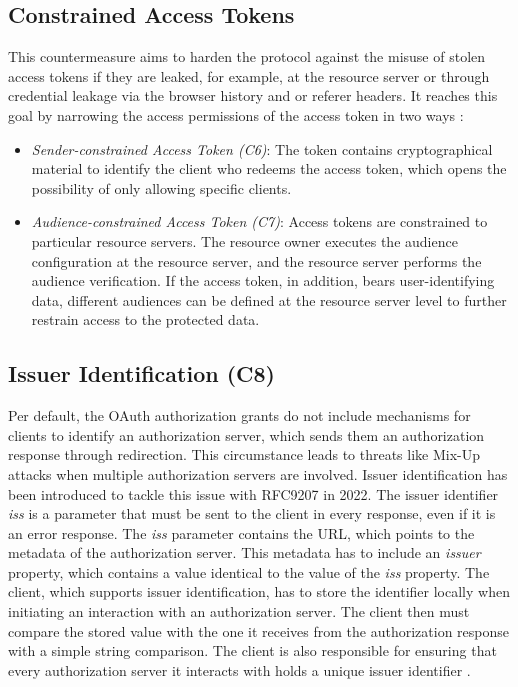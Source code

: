 \subsection{Constrained Access Tokens}
\label{counter:C6_7}
This countermeasure aims to harden the protocol against the misuse of stolen access tokens if they are leaked, for example, at the resource server or through credential leakage via the browser history and or referer headers. It reaches this goal by narrowing the access permissions of the access token in two ways \cite{lodderstedt2020oauth}:
\begin{itemize}
	\item \emph{Sender-constrained Access Token (C6)}: The token contains cryptographical material to identify the client who redeems the access token, which opens the possibility of only allowing specific clients.
	\item \emph{Audience-constrained Access Token (C7)}: Access tokens are constrained to particular resource servers. The resource owner executes the audience configuration at the resource server, and the resource server performs the audience verification. If the access token, in addition, bears user-identifying data, different audiences can be defined at the resource server level to further restrain access to the protected data.
\end{itemize}

 
\subsection[Issuer Identification]{Issuer Identification (C8)}
\label{counter:C8}
Per default, the OAuth authorization grants do not include mechanisms for clients to identify an authorization server, which sends them an authorization response through redirection. This circumstance leads to threats like Mix-Up attacks when multiple authorization servers are involved. Issuer identification has been introduced to tackle this issue with RFC9207 in 2022. The issuer identifier \emph {iss} is a parameter that must be sent to the client in every response, even if it is an error response. The \emph{iss} parameter contains the URL, which points to the metadata of the authorization server. This metadata has to include an \emph{issuer} property, which contains a value identical to the value of the \emph{iss} property. The client, which supports issuer identification, has to store the identifier locally when initiating an interaction with an authorization server. The client then must compare the stored value with the one it receives from the authorization response with a simple string comparison. The client is also responsible for ensuring that every authorization server it interacts with holds a unique issuer identifier \cite{meyer2022rfc}.


